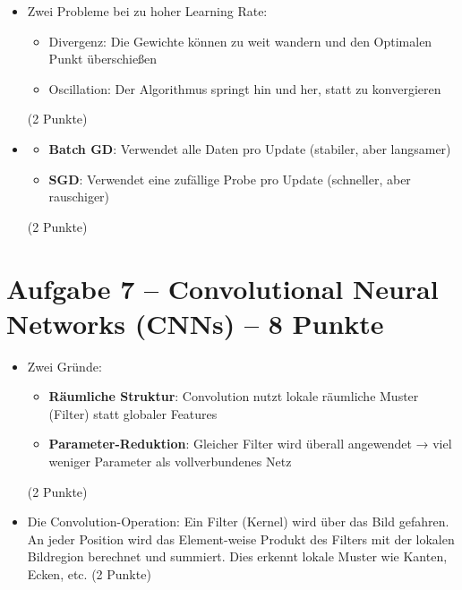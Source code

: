 \begin{itemize}
\item [c)] Zwei Probleme bei zu hoher Learning Rate:
\begin{itemize}
  \item Divergenz: Die Gewichte können zu weit wandern und den Optimalen Punkt überschießen
  \item Oscillation: Der Algorithmus springt hin und her, statt zu konvergieren
\end{itemize}
(2 Punkte)
\end{itemize}

\begin{itemize}
\item [d)] 
\begin{itemize}
  \item \textbf{Batch GD}: Verwendet alle Daten pro Update (stabiler, aber langsamer)
  \item \textbf{SGD}: Verwendet eine zufällige Probe pro Update (schneller, aber rauschiger)
\end{itemize}
(2 Punkte)
\end{itemize}

\newpage

\section*{Aufgabe 7 -- Convolutional Neural Networks (CNNs) -- 8 Punkte}

\begin{itemize}
\item [a)] Zwei Gründe:
\begin{itemize}
  \item \textbf{Räumliche Struktur}: Convolution nutzt lokale räumliche Muster (Filter) statt globaler Features
  \item \textbf{Parameter-Reduktion}: Gleicher Filter wird überall angewendet → viel weniger Parameter als vollverbundenes Netz
\end{itemize}
(2 Punkte)
\end{itemize}

\begin{itemize}
\item [b)] Die Convolution-Operation: Ein Filter (Kernel) wird über das Bild gefahren. An jeder Position wird das Element-weise Produkt des Filters mit der lokalen Bildregion berechnet und summiert. Dies erkennt lokale Muster wie Kanten, Ecken, etc. (2 Punkte)
\end{itemize}

